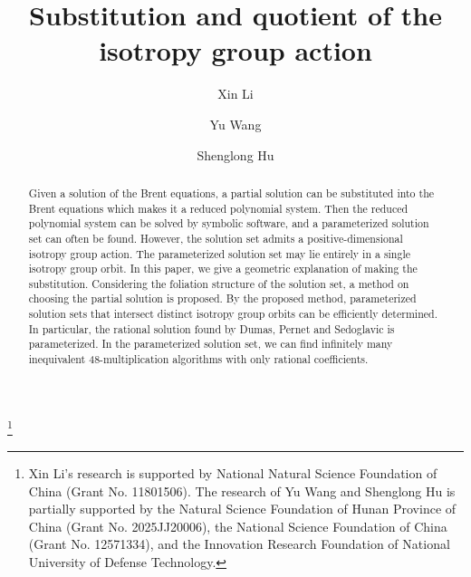 \documentclass[reqno]{amsart}
\theoremstyle{definition}
\numberwithin{equation}{section}
\theoremstyle{remark}
\begin{document}
\title{Substitution and quotient of the isotropy group action}
\pdfbookmark[0]{ }{}

\author[li]{Xin Li}
\address{School of Mathematical Sciences, Zhejiang University of Technology, Hangzhou 310023, Zhejiang, P. R. China}

\author[Wang]{Yu Wang}
\address{College of Science, National University of Defense Technology, Changsha 410072, Hunan, China.}

\author[Hu]{Shenglong Hu}
\address{College of Science, National University of Defense Technology, Changsha 410072, Hunan, China.}


\thanks{Xin Li's research is supported by National Natural Science Foundation of China (Grant No. 11801506). The research of Yu Wang and Shenglong Hu is partially supported by the Natural Science Foundation of Hunan Province of China (Grant No. 2025JJ20006), the National Science Foundation of China (Grant No. 12571334), and the Innovation Research Foundation of National University of Defense Technology.} 




\begin{abstract}
Given a solution of the Brent equations, a partial solution can be substituted into the Brent equations which makes it a reduced polynomial system. Then the reduced polynomial system can be solved by symbolic software, and a parameterized solution set can often be found. However, the solution set admits a positive-dimensional isotropy group action. The parameterized solution set may lie entirely in a single isotropy group orbit. In this paper, we give a geometric explanation of making the substitution. Considering the foliation structure of the solution set, a method on choosing the partial solution is proposed. By the proposed method, parameterized solution sets that intersect distinct isotropy group orbits can be efficiently determined. In particular, the rational solution found by Dumas, Pernet and Sedoglavic is parameterized. In the parameterized solution set, we can find infinitely many inequivalent 48-multiplication algorithms with only rational coefficients.
\end{abstract}
\maketitle
\end{document}

